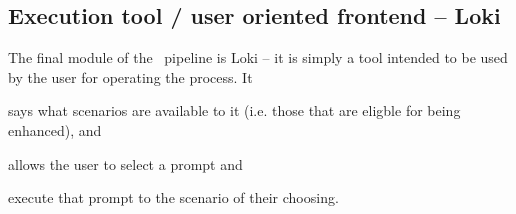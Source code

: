 \subsection{Execution tool / user oriented frontend -- Loki}


The final module of the \hefe~pipeline is Loki -- it is simply a tool intended
to be used by the user for operating the process. It \begin{inparaenum}
    \item  says what scenarios are available to it (i.e. those that are eligble for
    being enhanced), and
    \item allows the user to select a prompt and
    \item execute that prompt to the scenario of their choosing.
\end{inparaenum}


